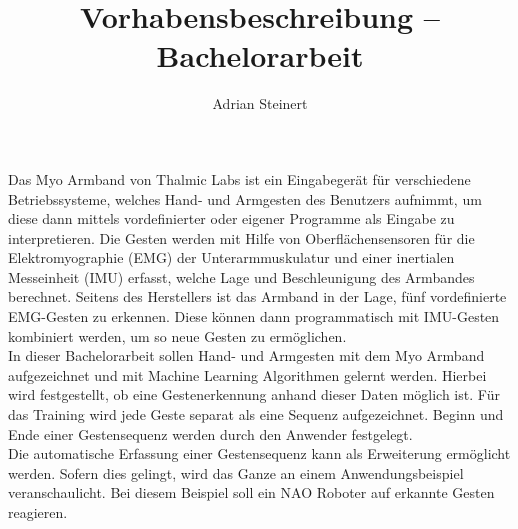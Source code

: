 \documentclass[]{scrartcl}
\title{Vorhabensbeschreibung -- Bachelorarbeit}
\author{Adrian Steinert}
\begin{document}
\maketitle

Das Myo Armband von Thalmic Labs ist ein Eingabegerät für verschiedene Betriebssysteme, welches Hand- und Armgesten des Benutzers aufnimmt, um diese dann mittels vordefinierter oder eigener Programme als Eingabe zu interpretieren. Die Gesten werden mit Hilfe von Oberflächensensoren für die Elektromyographie (EMG) der Unterarmmuskulatur und einer inertialen Messeinheit (IMU) erfasst, welche Lage und Beschleunigung des Armbandes berechnet. Seitens des Herstellers ist das Armband in der Lage, fünf vordefinierte EMG-Gesten zu erkennen. Diese können dann programmatisch mit IMU-Gesten kombiniert werden, um so neue Gesten zu ermöglichen.\\

In dieser Bachelorarbeit sollen Hand- und Armgesten mit dem Myo Armband aufgezeichnet und mit Machine Learning Algorithmen gelernt werden. Hierbei wird festgestellt, ob eine Gestenerkennung anhand dieser Daten möglich ist. Für das Training wird jede Geste separat als eine Sequenz aufgezeichnet. Beginn und Ende einer Gestensequenz werden durch den Anwender festgelegt.\\

Die automatische Erfassung einer Gestensequenz kann als Erweiterung ermöglicht werden. Sofern dies gelingt, wird das Ganze an einem Anwendungsbeispiel veranschaulicht. Bei diesem Beispiel soll ein NAO Roboter auf erkannte Gesten reagieren.
\end{document}
